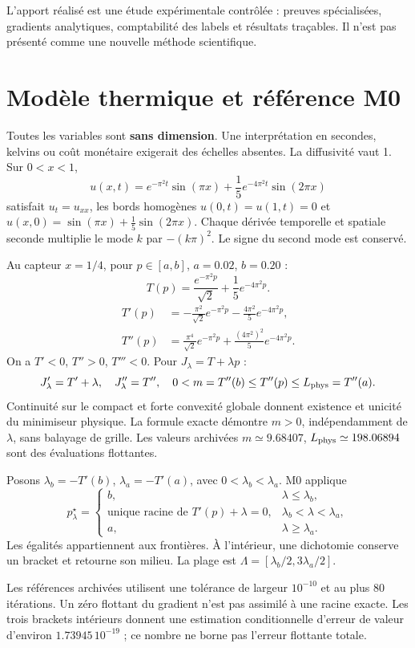 \documentclass[11pt,a4paper]{article}
\begin{document}
L'apport réalisé est une étude expérimentale contrôlée : preuves spécialisées,
gradients analytiques, comptabilité des labels et résultats traçables.
Il n'est pas présenté comme une nouvelle méthode scientifique.

\clearpage
\section{Modèle thermique et référence M0}
\label{sec:physique}
Toutes les variables sont \textbf{sans dimension}. Une interprétation en
secondes, kelvins ou coût monétaire exigerait des échelles absentes.
La diffusivité vaut 1. Sur $0<x<1$,
\[
u(x,t)=e^{-\pi^2t}\sin(\pi x)+\frac15e^{-4\pi^2t}\sin(2\pi x)
\]
satisfait $u_t=u_{xx}$, les bords homogènes $u(0,t)=u(1,t)=0$ et
$u(x,0)=\sin(\pi x)+\frac15\sin(2\pi x)$.
Chaque dérivée temporelle et spatiale seconde multiplie le mode $k$ par
$-(k\pi)^2$. Le signe du second mode est conservé.

Au capteur $x=1/4$, pour $p\in[a,b]$, $a=0.02$, $b=0.20$ :
\[
T(p)=\frac{e^{-\pi^2p}}{\sqrt2}+\frac15e^{-4\pi^2p}.
\]
\begin{align*}
T'(p)&=-\frac{\pi^2}{\sqrt2}e^{-\pi^2p}
       -\frac{4\pi^2}{5}e^{-4\pi^2p},\\
T''(p)&=\frac{\pi^4}{\sqrt2}e^{-\pi^2p}
       +\frac{(4\pi^2)^2}{5}e^{-4\pi^2p}.
\end{align*}
On a $T'<0$, $T''>0$, $T'''<0$. Pour $J_\lambda=T+\lambda p$ :
\[
J_\lambda'=T'+\lambda,\quad J_\lambda''=T'',\quad
0<m=T''(b)\leq T''(p)\leq L_{\rm phys}=T''(a).
\]
Continuité sur le compact et forte convexité globale donnent existence et
unicité du minimiseur physique. La formule exacte démontre $m>0$,
indépendamment de $\lambda$, sans balayage de grille.
Les valeurs archivées $m\simeq9.68407$, $L_{\rm phys}\simeq198.06894$
sont des évaluations flottantes.

Posons $\lambda_b=-T'(b)$, $\lambda_a=-T'(a)$, avec $0<\lambda_b<\lambda_a$.
M0 applique
\[
p^\star_\lambda=
\begin{cases}
b,&\lambda\leq\lambda_b,\\
\text{unique racine de }T'(p)+\lambda=0,&\lambda_b<\lambda<\lambda_a,\\
a,&\lambda\geq\lambda_a.
\end{cases}
\]
Les égalités appartiennent aux frontières. À l'intérieur, une dichotomie
conserve un bracket et retourne son milieu. La plage est
$\Lambda=[\lambda_b/2,3\lambda_a/2]$.

Les références archivées utilisent une tolérance de largeur $10^{-10}$
et au plus 80 itérations. Un zéro flottant du gradient n'est pas assimilé
à une racine exacte. Les trois brackets intérieurs donnent une estimation
conditionnelle d'erreur de valeur d'environ $1.73945\,10^{-19}$ ;
ce nombre ne borne pas l'erreur flottante totale.
\end{document}
